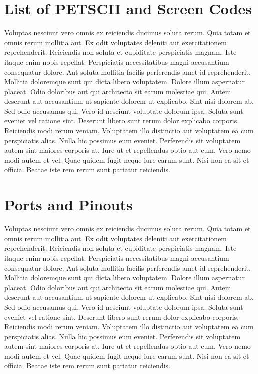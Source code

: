 \documentclass[
	11pt, %
	fleqn, %
	letterpaper, %
]{CommodoreBlueBook}
\begin{document}
\chapter*{List of PETSCII and Screen Codes}

Voluptas nesciunt vero omnis ex reiciendis ducimus soluta rerum. Quia totam et
omnis rerum mollitia aut. Ex odit voluptates deleniti aut exercitationem
reprehenderit. Reiciendis non soluta et cupiditate perspiciatis magnam. Iste
itaque enim nobis repellat. Perspiciatis necessitatibus magni accusantium
consequatur dolore. Aut soluta mollitia facilis perferendis amet id
reprehenderit. Mollitia doloremque sunt qui dicta libero voluptatem. Dolore
illum aspernatur placeat. Odio doloribus aut qui architecto sit earum molestiae
qui. Autem deserunt aut accusantium ut sapiente dolorem ut explicabo. Sint nisi
dolorem ab. Sed odio accusamus qui. Vero id nesciunt voluptate dolorum ipsa.
Soluta sunt eveniet vel ratione sint. Deserunt libero sunt rerum dolor
explicabo corporis. Reiciendis modi rerum veniam. Voluptatem illo distinctio
aut voluptatem ea cum perspiciatis alias. Nulla hic possimus eum eveniet.
Perferendis sit voluptatem autem sint maiores corporis at. Iure ut et
repellendus optio aut cum. Vero nemo modi autem et vel. Quae quidem fugit neque
iure earum sunt. Nisi non ea sit et officia. Beatae iste rem rerum sunt
pariatur reiciendis.

\chapter*{Ports and Pinouts}

Voluptas nesciunt vero omnis ex reiciendis ducimus soluta rerum. Quia totam et
omnis rerum mollitia aut. Ex odit voluptates deleniti aut exercitationem
reprehenderit. Reiciendis non soluta et cupiditate perspiciatis magnam. Iste
itaque enim nobis repellat. Perspiciatis necessitatibus magni accusantium
consequatur dolore. Aut soluta mollitia facilis perferendis amet id
reprehenderit. Mollitia doloremque sunt qui dicta libero voluptatem. Dolore
illum aspernatur placeat. Odio doloribus aut qui architecto sit earum molestiae
qui. Autem deserunt aut accusantium ut sapiente dolorem ut explicabo. Sint nisi
dolorem ab. Sed odio accusamus qui. Vero id nesciunt voluptate dolorum ipsa.
Soluta sunt eveniet vel ratione sint. Deserunt libero sunt rerum dolor
explicabo corporis. Reiciendis modi rerum veniam. Voluptatem illo distinctio
aut voluptatem ea cum perspiciatis alias. Nulla hic possimus eum eveniet.
Perferendis sit voluptatem autem sint maiores corporis at. Iure ut et
repellendus optio aut cum. Vero nemo modi autem et vel. Quae quidem fugit neque
iure earum sunt. Nisi non ea sit et officia. Beatae iste rem rerum sunt
pariatur reiciendis.
\end{document}
